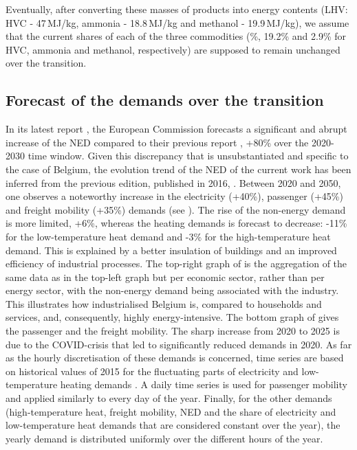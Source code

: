 Eventually, after converting these masses of products into energy contents (\ie LHV: \gls{HVC} - 47\,MJ/kg, ammonia - 18.8\,MJ/kg and methanol - 19.9\,MJ/kg), we assume that the current shares of each of the three commodities (\%, 19.2\% and 2.9\% for \gls{HVC}, ammonia and methanol, respectively) are supposed to remain unchanged over the transition.

\subsection{Forecast of the demands over the transition}
\label{subsec:cs:EUD_forecast}
In its latest report \cite{EuropeanCommission2021}, the European Commission forecasts a significant and abrupt increase of the \gls{NED} compared to their previous report \cite{EuropeanCommission2016}, \ie +80\% over the 2020-2030 time window. Given this discrepancy that is unsubstantiated and specific to the case of Belgium, the evolution trend of the \gls{NED} of the current work has been inferred from the previous edition, published in 2016, \cite{EuropeanCommission2016}. Between 2020 and 2050, one observes a noteworthy increase in the electricity (+40\%), passenger (+45\%) and freight mobility (+35\%) demands (see ). The rise of the non-energy demand is more limited, \ie +6\%, whereas the heating demands is forecast to decrease: -11\% for the low-temperature heat demand and -3\% for the high-temperature heat demand. This is explained by a better insulation of buildings and an improved efficiency of industrial processes. The top-right graph of  is the aggregation of the same data as in the top-left graph but per economic sector, rather than per energy sector, with the non-energy demand being associated with the industry. This illustrates how industrialised Belgium is, compared to households and services, and, consequently, highly energy-intensive. The bottom graph of  gives the passenger and the freight mobility. The sharp increase from 2020 to 2025 is due to the COVID-crisis that led to significantly reduced demands in 2020. As far as the hourly discretisation of these demands is concerned, time series are based on historical values of 2015 for the fluctuating parts of electricity and low-temperature heating demands \cite{Limpens2020}. A daily time series is used for passenger mobility and applied similarly to every day of the year. Finally, for the other demands (\ie high-temperature heat, freight mobility, \gls{NED} and the share of electricity and low-temperature heat demands that are considered constant over the year), the yearly demand is distributed uniformly over the different hours of the year.

